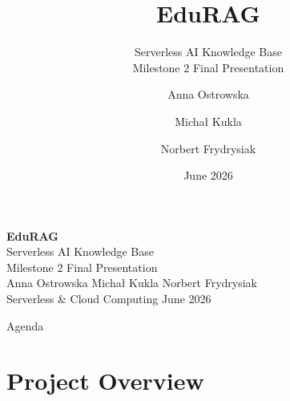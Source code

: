 \documentclass[aspectratio=169]{beamer}
\title[EduRAG]{\textbf{EduRAG}}
\subtitle{Serverless AI Knowledge Base\\[0.1cm]
  {\footnotesize Milestone 2 \textemdash{} Final Presentation}}
\author{Anna Ostrowska \and Micha\l{} Kukla \and Norbert Frydrysiak}
\date{June 2026}
\institute{Serverless \& Cloud Computing}
\begin{document}

{
\begin{frame}
  \color{white}
  \vspace{1.0cm}
  {\Huge\bfseries EduRAG}\\[0.2cm]
  {\large Serverless AI Knowledge Base}\\[0.05cm]
  {\small Milestone 2 \textemdash{} Final Presentation}\\[0.6cm]
  {\normalsize
    Anna Ostrowska
    \quad\textbullet\quad
    Micha\l{} Kukla
    \quad\textbullet\quad
    Norbert Frydrysiak}\\[0.15cm]
  {\footnotesize\color{white!65}
    Serverless \& Cloud Computing
    \hfill June 2026}
\end{frame}}

\begin{frame}{Agenda}
  \tableofcontents
\end{frame}

\section{Project Overview}
\end{document}
